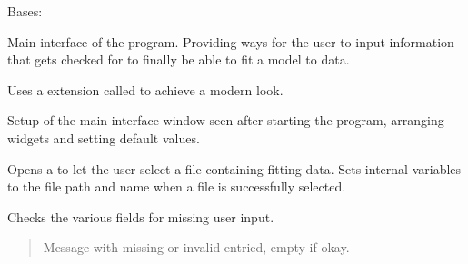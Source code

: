 \documentclass[letterpaper,10pt,english]{sphinxmanual}
\begin{document}
\begin{fulllineitems}
\label{\detokenize{CTkInterface:src.CTkInterface.MainApp}}
\pysigstartsignatures
{}
\pysigstopsignatures
\sphinxAtStartPar
Bases: 

\sphinxAtStartPar
Main interface of the program. Providing ways for the user to input information
that gets checked for to finally be able to fit a model to data.

\sphinxAtStartPar
Uses a  extension called  to achieve a modern look.

\begin{fulllineitems}
\label{\detokenize{CTkInterface:src.CTkInterface.MainApp.__init__}}
\pysigstartsignatures
{}
\pysigstopsignatures
\sphinxAtStartPar
Setup of the main interface window seen after starting the program,
arranging widgets and setting default values.

\end{fulllineitems}


\begin{fulllineitems}
\label{\detokenize{CTkInterface:src.CTkInterface.MainApp.browse_files}}
\pysigstartsignatures
{}
\pysigstopsignatures
\sphinxAtStartPar
Opens a  to let the user select a file containing fitting data.
Sets internal variables to the file path and name when a file is successfully selected.

\end{fulllineitems}


\begin{fulllineitems}
\label{\detokenize{CTkInterface:src.CTkInterface.MainApp.check_inputs_populated}}
\pysigstartsignatures
{}
\pysigstopsignatures
\sphinxAtStartPar
Checks the various fields for missing user input.
\begin{quote}\begin{description}
\sphinxAtStartPar
Message with missing or invalid entried, empty if okay.


\end{description}
\end{quote}
\end{fulllineitems}
\end{fulllineitems}
\end{document}
